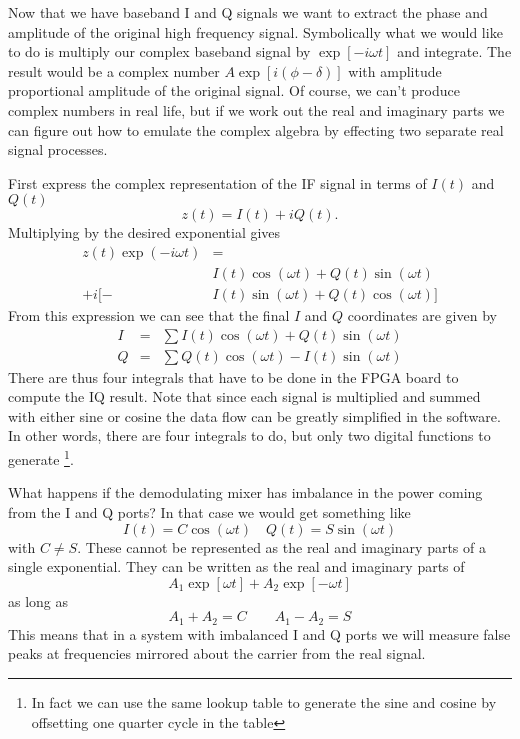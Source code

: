 
Now that we have baseband I and Q signals we want to extract the phase and amplitude of the original high frequency signal. Symbolically what we would like to do is multiply our complex baseband signal by $\exp \left[ -i \omega t \right]$ and integrate. The result would be a complex number $A \exp \left[ i \left( \phi - \delta \right) \right]$ with amplitude proportional amplitude of the original signal. Of course, we can't produce complex numbers in real life, but if we work out the real and imaginary parts we can figure out how to emulate the complex algebra by effecting two separate real signal processes.

First express the complex representation of the IF signal in terms of $I(t)$ and $Q(t)$ \begin{equation}
z(t) = I(t) + iQ(t). \end{equation}
Multiplying by the desired exponential gives \begin{align}
z(t) \exp \left(-i \omega t \right) &= \nonumber \\
        & I(t) \cos (\omega t) + Q(t) \sin (\omega t) \nonumber \\
+ i [ - & I(t) \sin (\omega t) + Q(t) \cos (\omega t) ] \end{align}
From this expression we can see that the final $I$ and $Q$ coordinates are given by \begin{eqnarray}
I &=& \sum I(t)\cos(\omega t) + Q(t) \sin(\omega t) \\
Q &=& \sum Q(t)\cos(\omega t) - I(t) \sin(\omega t) \end{eqnarray}
There are thus four integrals that have to be done in the FPGA board to compute the IQ result. Note that since each signal is multiplied and summed with either sine or cosine the data flow can be greatly simplified in the software. In other words, there are four integrals to do, but only two digital functions to generate \footnote{In fact we can use the same lookup table to generate the sine and cosine by offsetting one quarter cycle in the table}.


What happens if the demodulating mixer has imbalance in the power coming from the I and Q ports? In that case we would get something like \begin{equation}
I(t) = C \cos (\omega t) \quad Q(t) = S \sin (\omega t) \end{equation}
with $C \neq S$. These cannot be represented as the real and imaginary parts of a single exponential. They can be written as the real and imaginary parts of \begin{equation}
A_1 \exp \left[ \omega t \right] + A_2 \exp \left[ -\omega t \right] \end{equation}
as long as \begin{equation}
A_1 + A_2 = C \qquad A_1 - A_2 = S \end{equation}
This means that in a system with imbalanced I and Q ports we will measure false peaks at frequencies mirrored about the carrier from the real signal.
